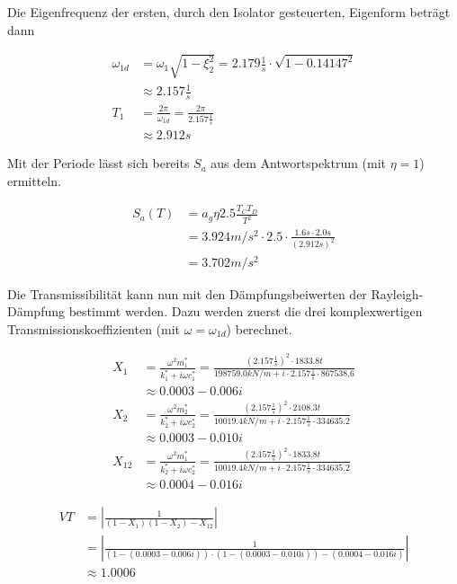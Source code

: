 Die Eigenfrequenz der ersten, durch den Isolator gesteuerten, Eigenform beträgt dann

\begin{align*}
\omega_{1d} &= \omega_1 \sqrt{1 - \xi_2^2} = 2.179 \frac{1}{s} \cdot \sqrt{1 - 0.14147^2}\\
            &\approx 2.157 \frac{1}{s}\\
T_1         &= \frac{2 \pi}{\omega_{1d}} = \frac{2 \pi}{2.157 \frac{1}{s}}\\
            &\approx 2.912 s
\end{align*}

\pagebreak

Mit der Periode lässt sich bereits $S_a$ aus dem Antwortspektrum (mit $\eta=1$) ermitteln.

\begin{align*}
S_a(T) &= a_g \eta 2.5 \frac{T_C T_D}{T^2}\\
       &= 3.924 m/s^2 \cdot 2.5 \cdot \frac{1.6 s \cdot 2.0 s}{(2.912 s)^2}\\
       &= 3.702 m/s^2
\end{align*}

Die Transmissibilität kann nun mit den Dämpfungsbeiwerten der Rayleigh-Dämpfung bestimmt werden. Dazu werden zuerst die drei komplexwertigen Transmissionskoeffizienten (mit $\omega = \omega_{1d}$) berechnet.

\begin{align*}
X_1 &= \frac{\omega^2 m_1^*}{k_1^* + i \omega c_1^*} = \frac{(2.157 \frac{1}{s})^2 \cdot 1833.8 t}{198759.0kN/m + i \cdot 2.157 \frac{1}{s} \cdot 867538.6}\\
    &\approx 0.0003 - 0.006i\\[2em]
X_2 &= \frac{\omega^2 m_2^*}{k_2^* + i \omega c_2^*} = \frac{(2.157 \frac{1}{s})^2 \cdot 2108.3 t}{10019.4kN/m + i \cdot 2.157 \frac{1}{s} \cdot 334635.2}\\
    &\approx 0.0003 - 0.010i\\[2em]
X_{12} &= \frac{\omega^2 m_1^*}{k_2^* + i \omega c_2^*} = \frac{(2.157 \frac{1}{s})^2 \cdot 1833.8 t}{10019.4kN/m + i \cdot 2.157 \frac{1}{s} \cdot 334635.2}\\
    &\approx 0.0004 - 0.016i
\end{align*}

\begin{align*}
VT &= \left\lvert \frac{1}{(1 - X_1)(1 - X_2) - X_{12}} \right\rvert\\
   &= \left\lvert \frac{1}{(1 - (0.0003 - 0.006i)) \cdot (1 - (0.0003 - 0.010i)) - (0.0004 - 0.016i)} \right\rvert\\
   &\approx 1.0006
\end{align*}

